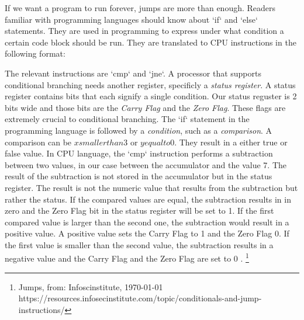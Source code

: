 If we want a program to run forever, jumps are more than enough. Readers familiar with programming languages should know about `if` and `else` statements. They are used in programming to express
under what condition a certain code block should be run. They are translated to CPU instructions
in the following format:
\newline
\bigskip
\raggedright
The relevant instructions are `cmp` and `jne`. A processor that supports conditional branching needs
another register, specificly a \textit{status register}. A status register contains bits that each signify
a single condition. Our status reguster is 2 bits wide and those bits are the \textit{Carry Flag} and
the \textit{Zero Flag}. These flags are extremely crucial to conditional branching. The `if` statement
in the programming language is followed by a \textit{condition}, such as a \textit{comparison}. A comparison
can be $x smaller than 3$ or $y equal to 0$. They result in a either true or false value. In 
CPU language, the `cmp` instruction performs a subtraction between two values, in our case between
the accumulator and the value 7. The result of the subtraction is not stored in the accumulator
but in the status register. The result is not the numeric value that results from the subtraction 
but rather the status. If the compared values are equal, the subtraction results in in zero and the
Zero Flag bit in the status register will be set to 1. If the first compared value is larger than the second one, the subtraction would result in a positive value. A positive value sets the
Carry Flag to 1 and the Zero Flag 0.
If the first value is smaller than the second value, the subtraction results in a negative value and
the Carry Flag and the Zero Flag are set to 0 . \footnote{Jumps, from: Infoscinstitute, \today \\ https://resources.infosecinstitute.com/topic/conditionals-and-jump-instructions/}


